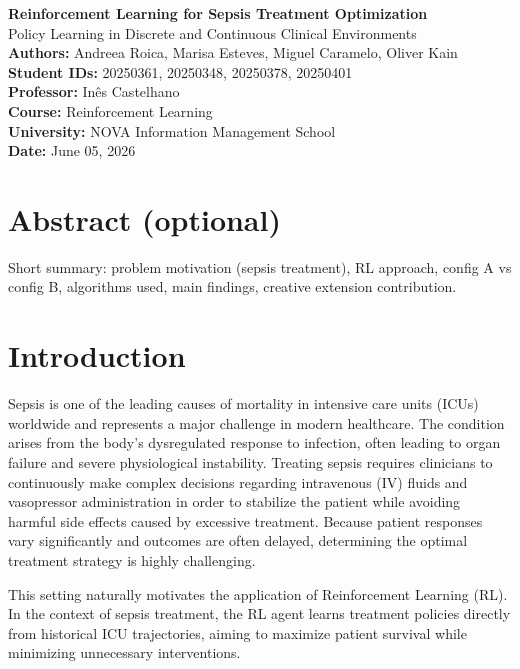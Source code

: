 \documentclass[11pt,a4paper]{article}
\begin{document}
\begin{titlepage}
\centering
\vspace*{7cm}
{\LARGE \textbf{Reinforcement Learning for Sepsis Treatment Optimization}}\\[0.5cm]
{\large Policy Learning in Discrete and Continuous Clinical Environments}\\[10cm]
\textbf{Authors:} Andreea Roica, Marisa Esteves, Miguel Caramelo, Oliver Kain \\
\textbf{Student IDs:} 20250361, 20250348, 20250378, 20250401 \\
\textbf{Professor:} Inês Castelhano\\
\textbf{Course:} Reinforcement Learning \\
\textbf{University:} NOVA Information Management School \\
\textbf{Date:} June 05, 2026
\vfill
\end{titlepage}

\tableofcontents
\clearpage

\section{Abstract (optional)}
Short summary: problem motivation (sepsis treatment), RL approach, config A vs config B, algorithms used, main findings, 
creative extension contribution.

\section{Introduction}

Sepsis is one of the leading causes of mortality in intensive care units (ICUs) worldwide and represents a major challenge in modern healthcare. 
The condition arises from the body’s dysregulated response to infection, often leading to organ failure and severe physiological instability.
Treating sepsis requires clinicians to continuously make complex decisions regarding intravenous (IV) fluids and vasopressor administration 
in order to stabilize the patient while avoiding harmful side effects caused by excessive treatment. 
Because patient responses vary significantly and outcomes are often delayed, determining the optimal treatment strategy is highly challenging.

This setting naturally motivates the application of Reinforcement Learning (RL).
In the context of sepsis treatment, the RL agent learns treatment policies directly from historical ICU trajectories, 
aiming to maximize patient survival while minimizing unnecessary interventions.
\end{document}
